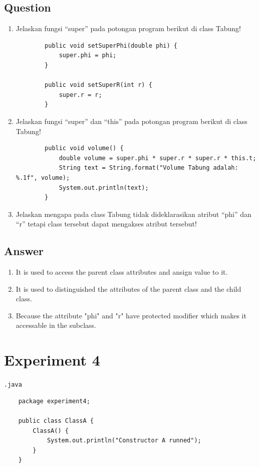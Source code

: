 \documentclass[12pt,titlepage]{article}
\begin{document}
\subsection{Question}
\begin{enumerate}
    \item Jelaskan fungsi “super” pada potongan program berikut di class Tabung!
    \begin{verbatim}
        public void setSuperPhi(double phi) {
            super.phi = phi;
        }
        
        public void setSuperR(int r) {
            super.r = r;
        }
    \end{verbatim}
    \item Jelaskan fungsi “super” dan “this” pada potongan program berikut di class Tabung!
    \begin{verbatim}
        public void volume() {
            double volume = super.phi * super.r * super.r * this.t;
            String text = String.format("Volume Tabung adalah: %.1f", volume);
            System.out.println(text);
        }
    \end{verbatim}
    \item Jelaskan mengapa pada class Tabung tidak dideklarasikan atribut “phi” dan “r” tetapi class tersebut dapat mengakses atribut tersebut!
\end{enumerate}
\subsection{Answer}
\begin{enumerate}
    \item It is used to access the parent class attributes and ansign value to it.
    \item It is used to distinguished the attributes of the parent class and the child class.
    \item Because the attribute "phi" and "r" have protected modifier which makes it accessable in the subclass. 
\end{enumerate}

\newpage
\section{Experiment 4}

\texttt{.java}
\begin{verbatim}
    package experiment4;

    public class ClassA {
        ClassA() {
            System.out.println("Constructor A runned");
        }
    }
\end{verbatim}
\end{document}
